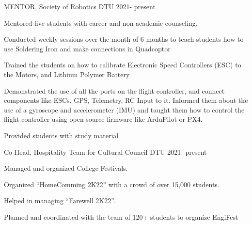 

\begin{cventries}

  \cventry
    {} %
    {MENTOR, Society of Robotics} %
    {DTU} %
    {2021- present} %
    {
      \begin{cvitems} %
        \item {Mentored five students with career and non-academic counseling.}
        \item {Conducted weekly sessions over the month of 6 months to teach students how to use Soldering Iron and make connections in Quadcoptor}
        \item {Trained the students on how to calibrate Electronic Speed Controllers (ESC) to the Motors, and Lithium Polymer Battery }
        \item {Demonstrated the use of all the ports on the flight controller, and connect components like ESCs, GPS, Telemetry, RC Input to it. Informed them about the use of a gyroscope and accelerometer (IMU) and taught them how to control the flight controller using open-source firmware like ArduPilot or PX4.}
        \item {Provided students with study material}
         {}
      \end{cvitems}
    }
  \cventry
    {} %
    {Co-Head, Hospitality Team for Cultural Council} %
    {DTU} %
    {2021- present} %
    {
      \begin{cvitems} %
        \item {Managed and organized College Festivals.}
        \item {Organized “HomeComming 2K22” with a crowd of over 15,000 students.}
        \item {Helped in managing “Farewell 2K22”.}
        \item {Planned and coordinated with the team of 120+ students to organize EngiFest}
        {}
      \end{cvitems}
    }

\end{cventries}

